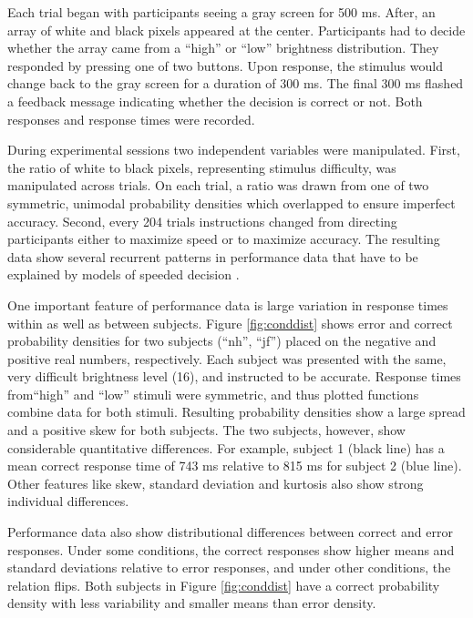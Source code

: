 \documentclass[12pt]{article}
\begin{document}
Each trial began with participants seeing a gray screen for 500 ms. After, an array of white and black pixels appeared at the center. Participants had to decide whether the array came from a ``high'' or ``low''
brightness distribution. They responded by pressing one of two buttons. Upon response, the stimulus would change back to the gray screen for a duration of 300 ms. The final 300 ms flashed a feedback message indicating whether the decision is correct or not. Both responses and response times were recorded.

During experimental sessions two independent variables were manipulated. First, the
ratio of white to black pixels, representing stimulus difficulty, was manipulated across
trials. On each trial, a ratio was drawn from one of two symmetric, unimodal probability densities which overlapped to ensure imperfect accuracy. Second,
every 204 trials instructions changed from directing participants either to
maximize speed or to maximize accuracy. The resulting data show several recurrent patterns in performance data that have to be explained by models of speeded decision \citep{RatMck2008}.

One important feature of performance data is large variation in response times within as well as between subjects. Figure \ref{fig:conddist} shows error and correct probability densities for two subjects (``nh'', ``jf'') placed on the negative and positive real numbers, respectively. Each subject was presented with the same, very difficult brightness level (16), and instructed to be accurate. Response times from``high'' and ``low'' stimuli were symmetric, and thus plotted functions combine data for both stimuli. Resulting probability densities show a large spread and a positive skew for both subjects. The two subjects, however, show considerable quantitative differences. For example, subject 1 (black line) has a mean correct response time of 743 ms relative to 815 ms for subject 2 (blue line). Other features like skew, standard deviation and kurtosis also show strong individual differences.

Performance data also show distributional differences between correct and error responses. Under some conditions, the correct responses show higher means and standard deviations relative to error responses, and under other conditions, the relation flips. Both subjects in Figure \ref{fig:conddist} have a correct probability density with less variability and smaller means than error density.
\end{document}
